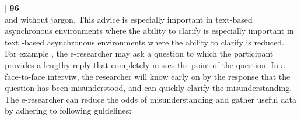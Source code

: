 \documentclass[a4paper]{beamer}
\begin{document}
\begin{frame}
\hspace*{0.1cm}\textbf{$|$}
\hspace*{0.1cm}\textbf{96}\\
and without jargon. This advice is especially important in text-based asynchronous environments where the ability to clarify is especially important in text -based asynchronous environments where the ability to clarify is reduced. For example , the e-researcher may ask a question to which the participant provides a lengthy reply that completely misses the point of the question. In a face-to-face interviw, the researcher will know early on by the response that the question has been misunderstood, and can quickly clarify the misunderstanding. The e-researcher can reduce the odds of misunderstanding and gather useful data by adhering to following guidelines:\\

\end{frame}
\end{document}

